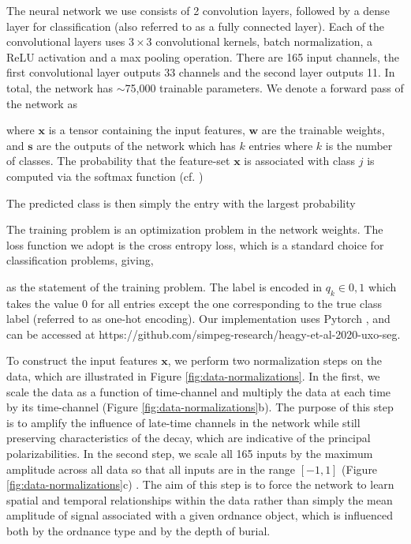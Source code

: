 \documentclass{segabs}
\begin{document}
The neural network we use consists of 2 convolution layers, followed by a dense layer for classification (also referred to as a fully connected layer). Each of the convolutional layers uses $3 \times 3$ convolutional kernels, batch normalization, a ReLU activation and a max pooling operation. There are 165 input channels, the first convolutional layer outputs 33 channels and the second layer outputs 11. In total, the network has $\sim$75,000 trainable parameters. We denote a forward pass of the network as

where $\mathbf{x}$ is a tensor containing the input features, $\mathbf{w}$ are the trainable weights, and $\mathbf{s}$ are the outputs of the network which has $k$ entries where $k$ is the number of classes. The probability that the feature-set $\mathbf{x}$ is associated with class $j$ is computed via the softmax function (cf. \cite{Hastie2009})

The predicted class is then simply the entry with the largest probability

The training problem is an optimization problem in the network weights. The loss function we adopt is the cross entropy loss, which is a standard choice for classification problems, giving,

as the statement of the training problem. The label is encoded in $q_k \in {0, 1}$ which takes the value 0 for all entries except the one corresponding to the true class label (referred to as one-hot encoding). Our implementation uses Pytorch \citep{Paszke2019}, and can be accessed at https://github.com/simpeg-research/heagy-et-al-2020-uxo-seg.

To construct the input features $\mathbf{x}$, we perform two normalization steps on the data, which are illustrated in Figure \ref{fig:data-normalizations}. In the first, we scale the data as a function of time-channel and multiply the data at each time by its time-channel (Figure \ref{fig:data-normalizations}b). The purpose of this step is to amplify the influence of late-time channels in the network while still preserving characteristics of the decay, which are indicative of the principal polarizabilities. In the second step, we scale all 165 inputs by the maximum amplitude across all data so that all inputs are in the range $[-1, 1]$ (Figure \ref{fig:data-normalizations}c) . The aim of this step is to force the network to learn spatial and temporal relationships within the data rather than simply the mean amplitude of signal associated with a given ordnance object, which is influenced both by the ordnance type and by the depth of burial.

\end{document}
